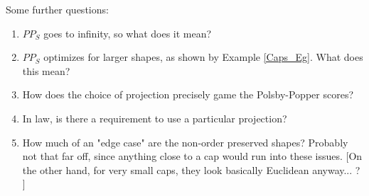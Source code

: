 \begin{Question}
  Some further questions:
  \begin{enumerate}
    \item $PP_S$ goes to infinity, so what does it mean?
    \item $PP_S$ optimizes for larger shapes, as shown by Example 
      \cref{Caps_Eg}. What does this mean? 
    \item How does the choice of projection precisely 
      game the Polsby-Popper scores?
    \item In law, is there a requirement to use a particular 
      projection?
    \item How much of an "edge case" are the non-order 
      preserved shapes? Probably not that far off, since 
      anything close to a cap would run into these issues. [On the other hand, for very small caps, they look basically Euclidean anyway... ? ] 
  \end{enumerate}
\end{Question}
